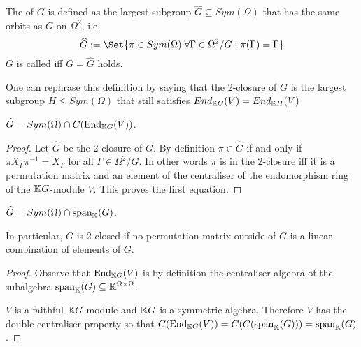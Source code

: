 \documentclass[fontsize=11pt,fleqn,a4paper]{scrartcl}
\begin{document}
\begin{definition}
The  of $G$ is defined as the largest subgroup $\widehat{G}\subseteq Sym(\Omega)$ that has the same orbits as $G$ on $\Omega^2$, i.e.
\[\widehat{G} := \Set{\pi\in Sym(\Omega) | \forall \Gamma\in \Omega^2/G: \pi(\Gamma) = \Gamma}\]
$G$ is called  iff $G=\widehat{G}$ holds.
\end{definition}

\begin{remark}
One can rephrase this definition by saying that the 2-closure of $G$ is the largest subgroup $H\leq Sym(\Omega)$ that still satisfies $End_{\mathbb{K} G}(V) = End_{\mathbb{K} H}(V)$
\end{remark}

\begin{lemma}\label{two_closure:in_terms_of_endomorphisms}
$\widehat{G} = Sym(\Omega)\cap C(\operatorname{End}_{\mathbb{K} G}(V))$.
\end{lemma}
\begin{proof}
Let $\widehat{G}$ be the 2-closure of $G$. By definition $\pi\in\widehat{G}$ if and only if $\pi X_\Gamma \pi^{-1} = X_\Gamma$ for all $\Gamma\in\Omega^2/G$. In other words $\pi$ is in the 2-closure iff it is a permutation matrix and an element of the centraliser of the endomorphism ring of the $\mathbb{K} G$-module $V$. This proves the first equation.
\end{proof}

\begin{lemma}
$\widehat{G}  = Sym(\Omega)\cap\operatorname{span}_{\mathbb{K}}(G)$.

In particular, $G$ is 2-closed if no permutation matrix outside of $G$ is a linear combination of elements of $G$.
\end{lemma}
\begin{proof}
Observe that $\operatorname{End}_{\mathbb{K} G}(V)$ is by definition the centraliser algebra of the subalgebra $\operatorname{span}_{\mathbb{K}}(G) \subseteq \mathbb{K}^{\Omega\times\Omega}$.

$V$ is a faithful $\mathbb{K} G$-module and $\mathbb{K} G$ is a symmetric algebra. Therefore $V$ has the double centraliser property so that $C(\operatorname{End}_{\mathbb{K} G}(V)) = C(C(\operatorname{span}_{\mathbb{K}}(G))) = \operatorname{span}_{\mathbb{K}}(G)$.
\end{proof}
\end{document}
